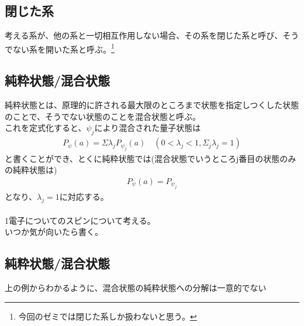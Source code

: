 \documentclass[a4paper,11pt]{jsarticle}
\begin{document}
\subsection{閉じた系}
考える系が、他の系と一切相互作用しない場合、その系を閉じた系と呼び、そうでない系を開いた系と呼ぶ。\footnote{今回のゼミでは閉じた系しか扱わないと思う。}\\
\subsection{純粋状態/混合状態}
純粋状態とは、原理的に許される最大限のところまで状態を指定しつくした状態のことで、そうでない状態のことを混合状態と呼ぶ。\\
これを定式化すると、$\psi _j$により混合された量子状態は
\begin{align}
P_{\psi}(a)=\Sigma \lambda _j P_{\psi _j}(a)\quad (0<\lambda _j <1,\Sigma_j \lambda _j=1)
\end{align}
と書くことができ、とくに純粋状態では(混合状態でいうところj番目の状態のみの純粋状態は)
\begin{align}
P_{\psi}(a)= P_{\psi _j}
\end{align}
となり、$\lambda_j =1$に対応する。\\

\\
1電子についてのスピンについて考える。\\
いつか気が向いたら書く。
\subsection{純粋状態/混合状態}
上の例からわかるように、混合状態の純粋状態への分解は一意的でない
\end{document}
